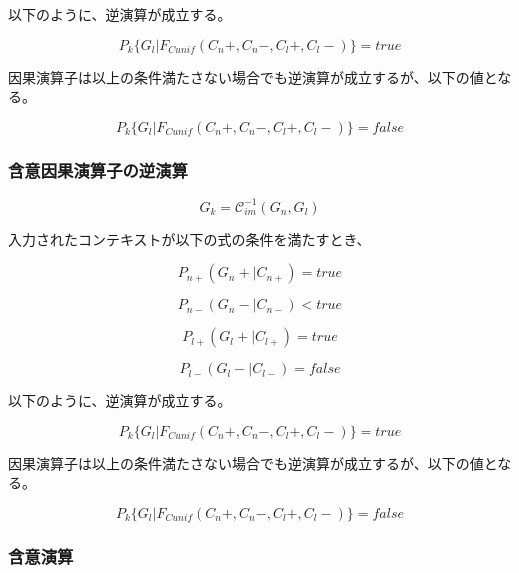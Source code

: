 \documentclass[12pt]{article}
\begin{document}
以下のように、逆演算が成立する。

\begin{equation} P_k\{G_l|F_{Cunif}(C_n+,C_n-,C_l+,C_l-)\}=true\end{equation}

因果演算子は以上の条件満たさない場合でも逆演算が成立するが、以下の値となる。

\begin{equation} P_k\{G_l|F_{Cunif}(C_n+,C_n-,C_l+,C_l-)\}=false\end{equation}

\subsubsection{含意因果演算子の逆演算}\label{ux542bux610fux56e0ux679cux6f14ux7b97ux5b50ux306eux9006ux6f14ux7b97}

\begin{equation} G_k = \mathcal{C}_{im}^{-1}(G_n,G_l)\end{equation}

入力されたコンテキストが以下の式の条件を満たすとき、

\begin{equation} P_{n+}(G_n+|C_{n+})=true\end{equation}

\begin{equation} P_{n-}(G_n-|C_{n-}) < true\end{equation}

\begin{equation} P_{l+}(G_l+|C_{l+})=true \end{equation}

\begin{equation} P_{l-}(G_l-|C_{l-}) = false \end{equation}

以下のように、逆演算が成立する。

\begin{equation} P_k\{G_l|F_{Cunif}(C_n+,C_n-,C_l+,C_l-)\}=true\end{equation}

因果演算子は以上の条件満たさない場合でも逆演算が成立するが、以下の値となる。

\begin{equation} P_k\{G_l|F_{Cunif}(C_n+,C_n-,C_l+,C_l-)\}=false\end{equation}

\subsubsection{含意演算}\label{ux542bux610fux6f14ux7b97}
\end{document}

